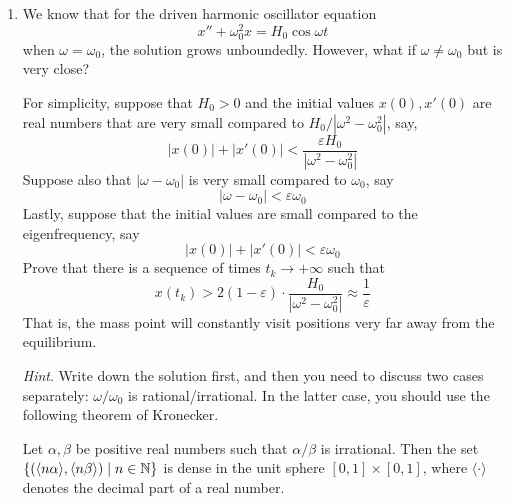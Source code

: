 \documentclass[../psets.tex]{subfiles}
\begin{document}
\begin{enumerate}
    \begin{equation*}
        \e[tA]z_0+r(t)\e[\zeta t]
    \end{equation*}
    where $z_0$ is a constant vector (\emph{not} necessarily the initial value) and $r(t)$ is a polynomial vector with degree $\deg p(t)+\alpha$.
    \begin{proof}
        Shao said in office hours that this question cannot be answered, and as such he would cancel it; he copied it out of Teschl but it had an error as written.
    \end{proof}
    \item We know that for the driven harmonic oscillator equation
    \begin{equation*}
        x''+\omega_0^2x = H_0\cos\omega t
    \end{equation*}
    when $\omega=\omega_0$, the solution grows unboundedly. However, what if $\omega\neq\omega_0$ but is very close?\par
    For simplicity, suppose that $H_0>0$ and the initial values $x(0),x'(0)$ are real numbers that are very small compared to $H_0/|\omega^2-\omega_0^2|$, say,
    \begin{equation*}
        |x(0)|+|x'(0)| < \frac{\varepsilon H_0}{|\omega^2-\omega_0^2|}
    \end{equation*}
    Suppose also that $|\omega-\omega_0|$ is very small compared to $\omega_0$, say
    \begin{equation*}
        |\omega-\omega_0| < \varepsilon\omega_0
    \end{equation*}
    Lastly, suppose that the initial values are small compared to the eigenfrequency, say
    \begin{equation*}
        |x(0)|+|x'(0)| < \varepsilon\omega_0
    \end{equation*}
    Prove that there is a sequence of times $t_k\to +\infty$ such that
    \begin{equation*}
        x(t_k) > 2(1-\varepsilon)\cdot\frac{H_0}{|\omega^2-\omega_0^2|}
        \approx \frac{1}{\varepsilon}
    \end{equation*}
    That is, the mass point will constantly visit positions very far away from the equilibrium.\par
    \emph{Hint}. Write down the solution first, and then you need to discuss two cases separately: $\omega/\omega_0$ is rational/irrational. In the latter case, you should use the following theorem of Kronecker.
    \begin{theorem}
        Let $\alpha,\beta$ be positive real numbers such that $\alpha/\beta$ is irrational. Then the set $\{(\langle n\alpha\rangle,\langle n\beta\rangle)\mid n\in\mathbb{N}\}$ is dense in the unit sphere $[0,1]\times[0,1]$, where $\langle\cdot\rangle$ denotes the decimal part of a real number.

\end{theorem}
\end{enumerate}
\end{document}
